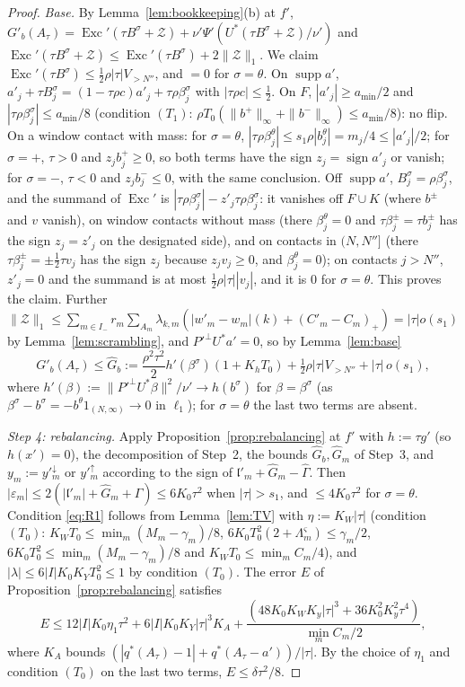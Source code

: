 \documentclass[10pt]{amsart}
\theoremstyle{definition}
\theoremstyle{remark}
\newcommand{\supp}{\operatorname{supp}}
\newcommand{\sgn}{\operatorname{sign}}
\newcommand{\lin}{\mathfrak l}
\newcommand{\Exc}{\operatorname{Exc}}
\begin{document}
\begin{proof}
\emph{Base.}  By Lemma~\ref{lem:bookkeeping}(b) at $f'$,
$G'_b(A_\tau)=\Exc'(\tau B^\sigma+\mathcal Z)+\nu'\Psi'(U^*(\tau B^\sigma+
\mathcal Z)/\nu')$ and $\Exc'(\tau B^\sigma+\mathcal Z)\le\Exc'(\tau B^\sigma)
+2\|\mathcal Z\|_1$.  We claim $\Exc'(\tau B^\sigma)\le\frac12\rho|\tau|
V_{>N''}$, and $=0$ for $\sigma=\theta$.  On $\supp a'$,
$a'_j+\tau B^\sigma_j=(1-\tau\rho c)a'_j+\tau\rho\beta^\sigma_j$ with
$|\tau\rho c|\le\frac12$.  On $F$, $|a'_j|\ge a_{\min}/2$ and
$|\tau\rho\beta^\sigma_j|\le a_{\min}/8$ (condition $(T_1)$: $\rho T_0
(\|b^+\|_\infty+\|b^-\|_\infty)\le a_{\min}/8$): no flip.  On a window
contact with mass: for $\sigma=\theta$, $|\tau\rho\beta^\theta_j|\le
s_1\rho|b^\theta_j|=m_j/4\le|a'_j|/2$; for $\sigma=+$, $\tau>0$ and
$z_jb^+_j\ge0$, so both terms have the sign $z_j=\sgn a'_j$ or vanish; for
$\sigma=-$, $\tau<0$ and $z_jb^-_j\le0$, with the same conclusion.  Off
$\supp a'$, $B^\sigma_j=\rho\beta^\sigma_j$, and the summand of $\Exc'$ is
$|\tau\rho\beta^\sigma_j|-z'_j\tau\rho\beta^\sigma_j$: it vanishes off
$F\cup K$ (where $b^\pm$ and $v$ vanish), on window contacts without mass
(there $\beta^\theta_j=0$ and $\tau\beta^\pm_j=\tau b^\pm_j$ has the sign
$z_j=z'_j$ on the designated side), and on contacts in $(N,N'']$ (there
$\tau\beta^\pm_j=\pm\frac12\tau v_j$ has the sign $z_j$ because $z_jv_j\ge0$,
and $\beta^\theta_j=0$); on contacts $j>N''$, $z'_j=0$ and the summand is at
most $\frac12\rho|\tau||v_j|$, and it is $0$ for $\sigma=\theta$.  This proves
the claim.  Further $\|\mathcal Z\|_1\le\sum_{m\in I_-}r_m\sum_{A_m}
\lambda_{k,m}(|w'_m-w_m|(k)+(C'_m-C_m)_+)=|\tau|o(s_1)$ by
Lemma~\ref{lem:scrambling}, and $P'^\perp U^*a'=0$, so by
Lemma~\ref{lem:base}
\[
 G'_b(A_\tau)\le\hat G_b:=\frac{\rho^2\tau^2}2h'(\beta^\sigma)(1+K_hT_0)
 +\tfrac12\rho|\tau|V_{>N''}+|\tau|\,o(s_1),
\]
where $h'(\beta):=\|P'^\perp U^*\beta\|^2/\nu'\to h(b^\sigma)$ for
$\beta=\beta^\sigma$ (as $\beta^\sigma-b^\sigma=-b^\theta1_{(N,\infty)}\to0$
in $\ell_1$); for $\sigma=\theta$ the last two terms are absent.

\emph{Step 4: rebalancing.}  Apply Proposition~\ref{prop:rebalancing} at
$f'$ with $h:=\tau g'$ (so $h(x')=0$), the decomposition of Step~2, the
bounds $\hat G_b,\hat G_m$ of Step~3, and $y_m:=y'^\downarrow_m$ or
$y'^\uparrow_m$ according to the sign of $\lin'_m+\hat G_m-\hat\Gamma$.
Then $|\varepsilon_m|\le2(|\lin'_m|+\hat G_m+\hat\Gamma)\le6K_0\tau^2$ when
$|\tau|>s_1$, and $\le4K_0\tau^2$ for $\sigma=\theta$.  Condition
\eqref{eq:R1} follows from Lemma~\ref{lem:TV} with $\eta:=K_W|\tau|$
(condition $(T_0)$: $K_WT_0\le\min_m(M_m-\gamma_m)/8$, $6K_0T_0^2(2+
\Lambda^\varsigma_m)\le\gamma_m/2$, $6K_0T_0^2\le\min_m(M_m-\gamma_m)/8$ and
$K_WT_0\le\min_mC_m/4$), and $|\lambda|\le6|I|K_0K_YT_0^2\le1$ by
condition $(T_0)$.  The error $E$ of Proposition~\ref{prop:rebalancing}
satisfies
\[
 E\le12|I|K_0\eta_1\tau^2+6|I|K_0K_Y|\tau|^3K_A+\frac{(48K_0K_WK_y|\tau|^3
 +36K_0^2K_y^2\tau^4)}{\min_mC_m/2},
\]
where $K_A$ bounds $(|q^*(A_\tau)-1|+q^*(A_\tau-a'))/|\tau|$.  By the choice
of $\eta_1$ and condition $(T_0)$ on the last two terms, $E\le\delta\tau^2/8$.


\end{proof}
\end{document}
